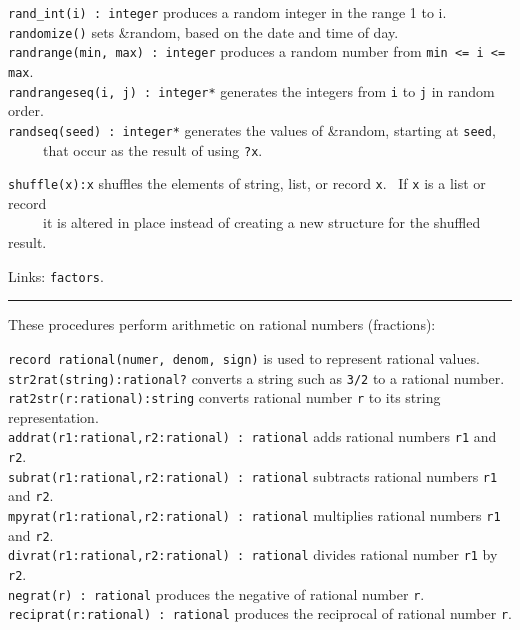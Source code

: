 \texttt{rand\_int(i) : integer} produces a random integer in the range 1
to i.\\
\texttt{randomize()} sets \&random, based on the
date and time of day. \\
\texttt{randrange(min, max) : integer} produces a random number from
\texttt{min {\textless}= i {\textless}= max}.\\
\texttt{randrangeseq(i, j) : integer*} generates the integers from
\texttt{i} to \texttt{j} in random order.\\
\texttt{randseq(seed) : integer*} generates the values of \&random,
starting at \texttt{seed},\\
 \ \ \ \ \ that occur as the result of using \texttt{?x}.

\texttt{shuffle(x):x} shuffles the elements of string, list, or record
\texttt{x}. \ If \texttt{x} is a list or record\\
 \ \ \ \ \ it is altered in place instead of creating a new structure for
the shuffled result.

Links: \texttt{factors}.

\vspace{0.25cm}\hrule{}

These procedures perform arithmetic on rational
numbers (fractions):

\texttt{record rational(numer, denom, sign)} is used to represent
rational values.\\
\texttt{str2rat(string):rational?} converts a string such as
\texttt{{\textquotedbl}3/2{\textquotedbl}} to a rational
number.\\
\texttt{rat2str(r:rational):string} converts rational number \texttt{r}
to its string representation.\\
\texttt{addrat(r1:rational,r2:rational) : rational} adds rational
numbers \texttt{r1} and \texttt{r2}.\\
\texttt{subrat(r1:rational,r2:rational) : rational} subtracts rational
numbers \texttt{r1} and \texttt{r2}.\\
\texttt{mpyrat(r1:rational,r2:rational) : rational} multiplies rational
numbers \texttt{r1} and \texttt{r2}.\\
\texttt{divrat(r1:rational,r2:rational) : rational} divides rational
number \texttt{r1} by \texttt{r2}.\\
\texttt{negrat(r) : rational} produces the negative of rational number
\texttt{r}.\\
\texttt{reciprat(r:rational) : rational} produces the reciprocal of
rational number \texttt{r}.

